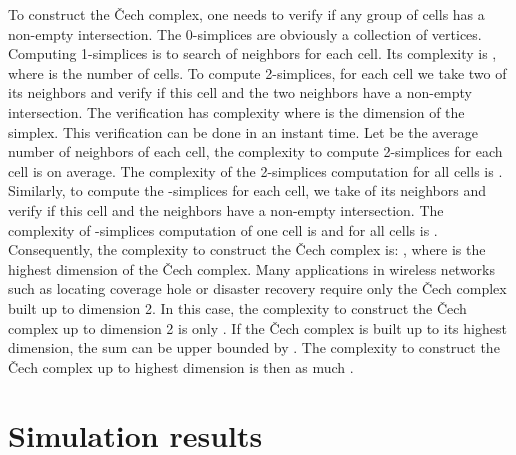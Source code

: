 \documentclass[conference]{IEEEtran}
\begin{document}
To construct the \v{C}ech complex, one needs to verify if any group of cells has a non-empty intersection.
The 0-simplices are obviously a collection of vertices.
Computing 1-simplices is to search of neighbors for each cell. Its complexity is , 
where  is the number of cells. To compute 2-simplices, for each cell we take two 
of its neighbors and verify if this cell and the two neighbors have a non-empty 
intersection. The verification has complexity  where  is the dimension of the simplex. This verification can be done in an instant time. Let  be the average number of neighbors of each cell, the complexity
to compute 2-simplices for each cell is  on average. The complexity of the 2-simplices computation
for all cells is . Similarly, to compute the -simplices for each cell, we take  
of its neighbors and verify if this cell and the neighbors have a non-empty intersection.
The complexity of -simplices computation of one cell is  and for all cells is 
. Consequently, the complexity to construct the \v{C}ech complex is: 
, where  is the highest
dimension of the \v{C}ech complex. 
Many applications in wireless networks such as locating coverage hole or disaster recovery require only the \v{C}ech complex built up to dimension 2. In this case, the complexity to construct the \v{C}ech complex up to dimension 2 is only . If the \v{C}ech complex is built up to its highest dimension, the sum  can be upper bounded by . The complexity
to construct the \v{C}ech complex up to highest dimension is then as much .

\section{Simulation results}
\label{sec:experiment}
\end{document}
